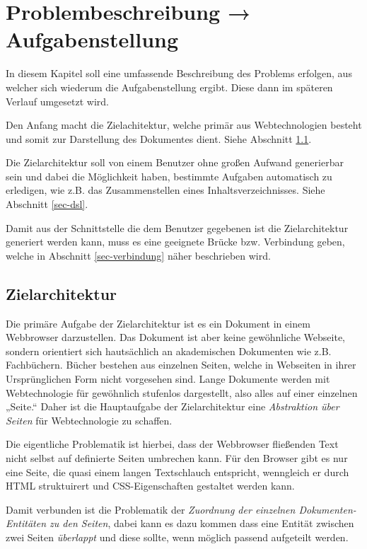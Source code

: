 \chapter{Problembeschreibung → Aufgabenstellung}

In diesem Kapitel soll eine umfassende Beschreibung des Problems erfolgen,
aus welcher sich wiederum die Aufgabenstellung ergibt. Diese dann im
späteren Verlauf umgesetzt wird.

Den Anfang macht die Zielachitektur, welche primär aus Webtechnologien
besteht und somit zur Darstellung des Dokumentes dient. Siehe
Abschnitt \ref{sec-zielarchitektur}.

Die Zielarchitektur soll von einem Benutzer ohne großen Aufwand
generierbar sein und dabei die Möglichkeit haben, bestimmte
Aufgaben automatisch zu erledigen, wie z.B. das Zusammenstellen
eines Inhaltsverzeichnisses. Siehe Abschnitt \ref{sec-dsl}.

Damit aus der Schnittstelle die dem Benutzer gegebenen ist die Zielarchitektur
generiert werden kann, muss es eine geeignete Brücke bzw. Verbindung
geben, welche in Abschnitt \ref{sec-verbindung} näher beschrieben wird.


\section{Zielarchitektur}\label{sec-zielarchitektur}

Die primäre Aufgabe der Zielarchitektur ist es ein Dokument in
einem Webbrowser darzustellen. Das Dokument ist aber keine gewöhnliche
Webseite, sondern orientiert sich hautsächlich an akademischen
Dokumenten wie z.B. Fachbüchern. Bücher bestehen aus einzelnen Seiten,
welche in Webseiten in ihrer Ursprünglichen Form nicht vorgesehen sind.
Lange Dokumente werden mit Webtechnologie für gewöhnlich stufenlos
dargestellt, also alles auf einer einzelnen „Seite.“
Daher ist die Hauptaufgabe der Zielarchitektur eine \emph{Abstraktion
über Seiten} für Webtechnologie zu schaffen.

Die eigentliche Problematik ist hierbei, dass der Webbrowser fließenden
Text nicht selbst auf definierte Seiten umbrechen kann. Für den Browser
gibt es nur eine Seite, die quasi einem langen Textschlauch entspricht,
wenngleich er durch HTML struktuirert und
CSS-Eigenschaften gestaltet werden kann.

Damit verbunden ist die Problematik der
\emph{Zuordnung der einzelnen Dokumenten-Entitäten zu den Seiten},
dabei kann es dazu kommen dass eine Entität zwischen zwei Seiten
\emph{überlappt} und diese sollte, wenn möglich passend aufgeteilt werden.

